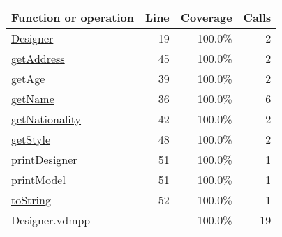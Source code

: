 \begin{longtable}{|l|r|r|r|}
\hline
Function or operation & Line & Coverage & Calls \\
\hline
\hline
\hyperref[Designer:19]{Designer} & 19&100.0\% & 2 \\
\hline
\hyperref[getAddress:45]{getAddress} & 45&100.0\% & 2 \\
\hline
\hyperref[getAge:39]{getAge} & 39&100.0\% & 2 \\
\hline
\hyperref[getName:36]{getName} & 36&100.0\% & 6 \\
\hline
\hyperref[getNationality:42]{getNationality} & 42&100.0\% & 2 \\
\hline
\hyperref[getStyle:48]{getStyle} & 48&100.0\% & 2 \\
\hline
\hyperref[printDesigner:51]{printDesigner} & 51&100.0\% & 1 \\
\hline
\hyperref[printModel:51]{printModel} & 51&100.0\% & 1 \\
\hline
\hyperref[toString:52]{toString} & 52&100.0\% & 1 \\
\hline
\hline
Designer.vdmpp & & 100.0\% & 19 \\
\hline
\end{longtable}

